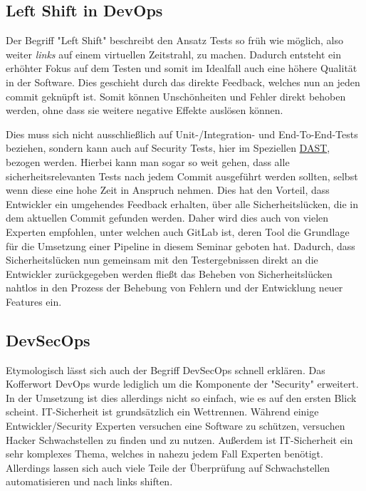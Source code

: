 \subsection{Left Shift in DevOps}

Der Begriff "Left Shift" beschreibt den Ansatz Tests so früh wie möglich, also weiter \textit{links} auf einem virtuellen Zeitstrahl, zu machen.
Dadurch entsteht ein erhöhter Fokus auf dem Testen und somit im Idealfall auch eine höhere Qualität in der Software.\cite{dr.darrellr.schragDevOpsShiftLeft2016}
Dies geschieht durch das direkte Feedback, welches nun an jeden commit geknüpft ist.
Somit können Unschönheiten und Fehler direkt behoben werden, ohne dass sie weitere negative Effekte auslösen können.

Dies muss sich nicht ausschließlich auf Unit-/Integration- und End-To-End-Tests beziehen, sondern kann auch auf Security Tests, hier im Speziellen \hyperref[subsubsec:dast]{DAST}, bezogen werden.
Hierbei kann man sogar so weit gehen, dass alle sicherheitsrelevanten Tests nach jedem Commit ausgeführt werden sollten, selbst wenn diese eine hohe Zeit in Anspruch nehmen.
Dies hat den Vorteil, dass Entwickler ein umgehendes Feedback erhalten, über alle Sicherheitslücken, die in dem aktuellen Commit gefunden werden.
Daher wird dies auch von vielen Experten empfohlen, unter welchen auch GitLab ist, deren Tool die Grundlage für die Umsetzung einer Pipeline in diesem Seminar geboten hat.\cite{gitlabSeismicShiftApplication2020}
Dadurch, dass Sicherheitslücken nun gemeinsam mit den Testergebnissen direkt an die Entwickler zurückgegeben werden fließt das Beheben von Sicherheitslücken nahtlos in den Prozess der Behebung von Fehlern und der Entwicklung neuer Features ein.


\subsection{DevSecOps}

Etymologisch lässt sich auch der Begriff DevSecOps schnell erklären.
Das Kofferwort DevOps wurde lediglich um die Komponente der "Security" erweitert.
In der Umsetzung ist dies allerdings nicht so einfach, wie es auf den ersten Blick scheint.
IT-Sicherheit ist grundsätzlich ein Wettrennen.
Während einige Entwickler/Security Experten versuchen eine Software zu schützen, versuchen Hacker Schwachstellen zu finden und zu nutzen.
Außerdem ist IT-Sicherheit ein sehr komplexes Thema, welches in nahezu jedem Fall Experten benötigt.
Allerdings lassen sich auch viele Teile der Überprüfung auf Schwachstellen automatisieren und nach links shiften.

